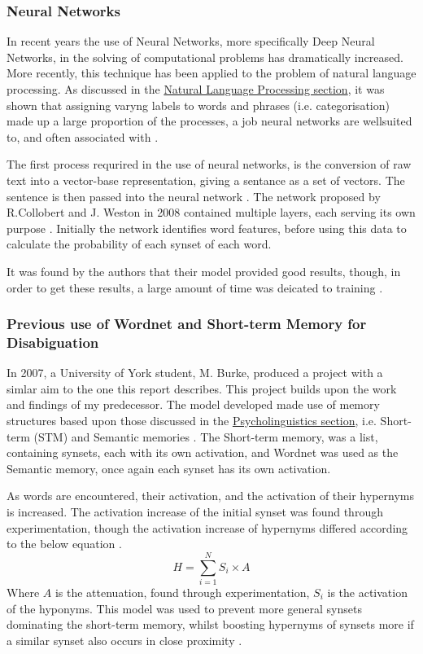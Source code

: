 \documentclass[]{article}
\begin{document}
\subsubsection{Neural Networks}
\label{sec:NeuralNetwork}
In recent years the use of Neural Networks, more specifically Deep Neural Networks, in the solving of computational problems has dramatically increased. More recently, this technique has been applied to the problem of natural language processing. As discussed in the \hyperref[sec:NLP]{Natural Language Processing section}, it was shown that assigning varyng labels to words and phrases (i.e. categorisation) made up a large proportion of the processes, a job neural networks are wellsuited to, and often associated with \cite{NeuralNetworks}. 

The first process requrired in the use of neural networks, is the conversion of raw text into a vector-base representation, giving a sentance as a set of vectors. The sentence is then passed into the neural network \cite{NeuralNetworks}. The network proposed by R.Collobert and J. Weston in 2008 contained multiple layers, each serving its own purpose \cite{NeuralNetworks}. Initially the network identifies word features, before using this data to calculate the probability of each synset of each word.

It was found by the authors that their model provided good results, though, in order to get these results, a large amount of time was deicated to training \cite{NeuralNetworks}.

\subsubsection{Previous use of Wordnet and Short-term Memory for Disabiguation}
\label{sec:MattBurke}

In 2007, a University of York student, M. Burke, produced a project with a simlar aim to the one this report describes. This project builds upon the work and findings of my predecessor. The model developed made use of memory structures based upon those discussed in the \hyperref[sec:Psycholinguistics]{Psycholinguistics section}, i.e. Short-term (STM) and Semantic memories \cite{MattBurkePrevious}. The Short-term memory, was a list, containing synsets, each with its own activation, and Wordnet was used as the Semantic memory, once again each synset has its own activation.    

As words are encountered, their activation, and the activation of their hypernyms is increased. The activation increase of the initial synset was found through experimentation, though the activation increase of hypernyms differed according to the below equation \cite{MattBurkePrevious}. 
\[H = \sum\limits_{i=1}^N S_i \times A\]
Where \(A\) is the attenuation, found through experimentation, \(S_i\) is the activation of the hyponyms. This model was used to prevent more general synsets dominating the short-term memory, whilst boosting hypernyms of synsets more if a similar synset also occurs in close proximity \cite{MattBurkePrevious}.
\end{document}
